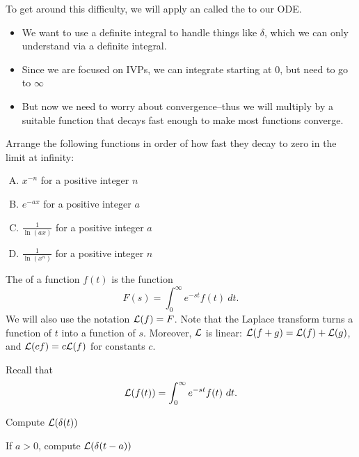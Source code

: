 \begin{applicationActivities}
\begin{observation}
To get around this difficulty, we will apply an  called the  to our ODE.
\vfill
\begin{itemize}
\item We want to use a definite integral to handle things like \(\delta\), which we can only understand via a definite integral.
\item Since we are focused on IVPs, we can integrate starting at \(0\), but need to go to \(\infty\)
\item But now we need to worry about convergence--thus we will multiply by a suitable function that decays fast enough to make most functions converge.
\end{itemize}
\end{observation}

\begin{activity}{5}
Arrange the following functions in order of how fast they decay to zero in the limit at infinity:
\begin{enumerate}[(A)]
\item \(x^{-n}\) for a positive integer \(n\)
\item \(e^{-ax}\) for a positive integer \(a\)
\item \(\frac{1}{\ln(ax)}\) for a positive integer \(a\)
\item \(\frac{1}{\ln(x^n)}\) for a positive integer \(n\)
\end{enumerate}
\end{activity}

\begin{definition}
The  of a function \(f(t)\) is the function
\[F(s)=\int _0 ^\infty e^{-st}f(t)\ dt.\]
We will also use the notation \(\mathcal{L}(f)=F\).
\vfill
Note that the Laplace transform turns a function of \(t\) into a function of \(s\).
\vfill
Moreover, \(\mathcal{L}\) is linear: \(\mathcal{L}(f+g)=\mathcal{L}(f)+\mathcal{L}(g)\), and \(\mathcal{L}(cf)=c\mathcal{L}(f)\) for constants \(c\).
\end{definition}


\begin{activity}{5}
Recall that \[\mathcal{L}(f(t))=\int _0 ^\infty e^{-st} f(t)\ dt.\]
\begin{subactivity}
Compute \(\mathcal{L}(\delta(t))\)
\end{subactivity}
\begin{subactivity}
If \(a>0\), compute \(\mathcal{L}(\delta(t-a))\)
\end{subactivity}
\end{activity}


\end{applicationActivities}
